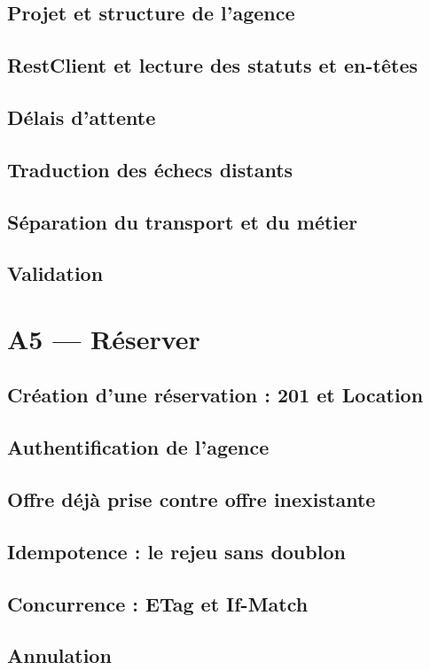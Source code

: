 \documentclass[11pt,a4paper]{report}
\begin{document}
\section{Projet et structure de l'agence}
\section{RestClient et lecture des statuts et en-têtes}
\section{Délais d'attente}
\section{Traduction des échecs distants}
\section{Séparation du transport et du métier}
\section{Validation}

\chapter{A5 --- Réserver}
\section{Création d'une réservation : 201 et Location}
\section{Authentification de l'agence}
\section{Offre déjà prise contre offre inexistante}
\section{Idempotence : le rejeu sans doublon}
\section{Concurrence : ETag et If-Match}
\section{Annulation}
\end{document}
